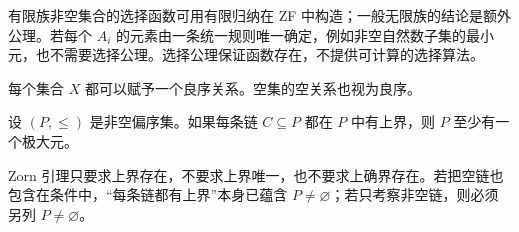 有限族非空集合的选择函数可用有限归纳在 ZF 中构造；一般无限族的结论是额外公理。若每个 $A_i$ 的元素由一条统一规则唯一确定，例如非空自然数子集的最小元，也不需要选择公理。选择公理保证函数存在，不提供可计算的选择算法。

\begin{theorem}[良序原则]\label{thm:y0-well-order-principle}
每个集合 $X$ 都可以赋予一个良序关系。空集的空关系也视为良序。
\end{theorem}

\begin{theorem}[Zorn 引理]\label{thm:y0-zorn}
设 $(P,\le)$ 是非空偏序集。如果每条链 $C\subseteq P$ 都在 $P$ 中有上界，则 $P$ 至少有一个极大元。
\end{theorem}

Zorn 引理只要求上界存在，不要求上界唯一，也不要求上确界存在。若把空链也包含在条件中，“每条链都有上界”本身已蕴含 $P\ne\varnothing$；若只考察非空链，则必须另列 $P\ne\varnothing$。

